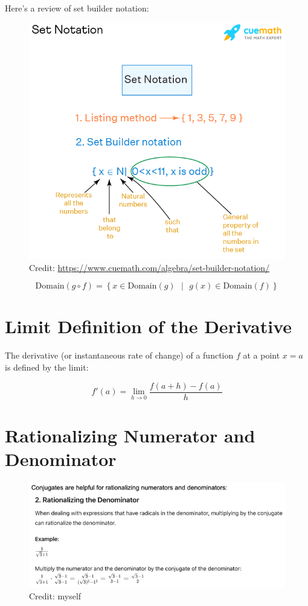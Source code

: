 \documentclass[12pt]{article}
\begin{document}
Here's a review of set builder notation:

\begin{figure}[H]
	\centering
	\includegraphics[scale=0.35]{sets.png}
	\caption{Credit: \url{https://www.cuemath.com/algebra/set-builder-notation/}}
\end{figure}

\[\text{Domain}(g\circ f)=\left\{x\in\text{Domain}(g)\text{ }|\text{ }g(x)\in\text{Domain}(f)\right\}\]

\section{Limit Definition of the Derivative}

The derivative (or instantaneous rate of change) of a function \(f\) at a point \( x = a \) is defined by the limit:

\[
f'(a) = \lim_{{h \to 0}} \frac{f(a+h) - f(a)}{h}
\]

\section{Rationalizing Numerator and Denominator}

\begin{figure}[H]
	\centering
	\includegraphics[width=\textwidth]{denominator}
	\caption{Credit: myself}
\end{figure}
\end{document}
